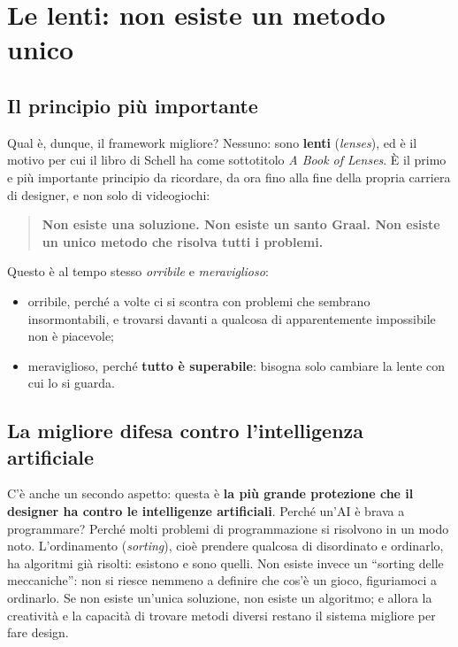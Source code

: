 \section{Le lenti: non esiste un metodo unico}
\label{sec:lenti}

\subsection{Il principio più importante}

Qual è, dunque, il framework migliore? Nessuno: sono \textbf{lenti}
(\emph{lenses}), ed è il motivo per cui il libro di Schell ha come sottotitolo
\emph{A Book of Lenses}. È il primo e più importante principio da ricordare,
da ora fino alla fine della propria carriera di designer, e non solo di
videogiochi:
\begin{quote}
\centering
\textbf{Non esiste una soluzione. Non esiste un santo Graal. Non esiste un
unico metodo che risolva tutti i problemi.}
\end{quote}
Questo è al tempo stesso \emph{orribile} e \emph{meraviglioso}:
\begin{itemize}
  \item orribile, perché a volte ci si scontra con problemi che sembrano
        insormontabili, e trovarsi davanti a qualcosa di apparentemente
        impossibile non è piacevole;
  \item meraviglioso, perché \textbf{tutto è superabile}: bisogna solo
        cambiare la lente con cui lo si guarda.
\end{itemize}

\subsection{La migliore difesa contro l'intelligenza artificiale}

C'è anche un secondo aspetto: questa è \textbf{la più grande protezione che il
designer ha contro le intelligenze artificiali}. Perché un'AI è brava a
programmare? Perché molti problemi di programmazione si risolvono in un modo
noto. L'ordinamento (\emph{sorting}), cioè prendere qualcosa di disordinato e
ordinarlo, ha algoritmi già risolti: esistono e sono quelli. Non esiste invece
un ``sorting delle meccaniche'': non si riesce nemmeno a definire che cos'è un
gioco, figuriamoci a ordinarlo. Se non esiste un'unica soluzione, non esiste un
algoritmo; e allora la creatività e la capacità di trovare metodi diversi
restano il sistema migliore per fare design.

